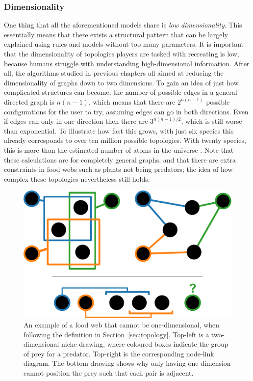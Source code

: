 \subsubsection{Dimensionality}
One thing that all the aforementioned models share is \emph{low dimensionality}. This essentially means that there exists a structural pattern that can be largely explained using rules and models without too many parameters.
It is important that the dimensionality of topologies players are tasked with recreating is low, because humans struggle with understanding high-dimensional information. After all, the algorithms studied in previous chapters all aimed at reducing the dimensionality of graphs down to two dimensions. To gain an idea of just how complicated structures can become, the number of possible edges in a general directed graph is $n(n-1)$, which means that there are $2^{n(n-1)}$ possible configurations for the user to try, assuming edges can go in both directions. Even if edges can only in one direction then there are $3^{n(n-1)/2}$, which is still worse than exponential. To illustrate how fast this grows, with just six species this already corresponds to over ten million possible topologies. With twenty species, this is more than the estimated number of atoms in the universe \cite{Guth2003}.
Note that these calculations are for completely general graphs, and that there are extra constraints in food webs such as plants not being predators; the idea of how complex these topologies nevertheless still holds.

\begin{figure}
  \centering
  \includegraphics[width=.85\textwidth]{joy/niche.pdf}
  \caption[An illustration of food web dimensionality]{An example of a food web that cannot be one-dimensional, when following the definition in Section~\ref{sec:topology}. Top-left is a two-dimensional niche drawing, where coloured boxes indicate the group of prey for a predator. Top-right is the corresponding node-link diagram.
  The bottom drawing shows why only having one dimension cannot position the prey such that each pair is adjacent.}
  \label{fig:niche}
\end{figure}

